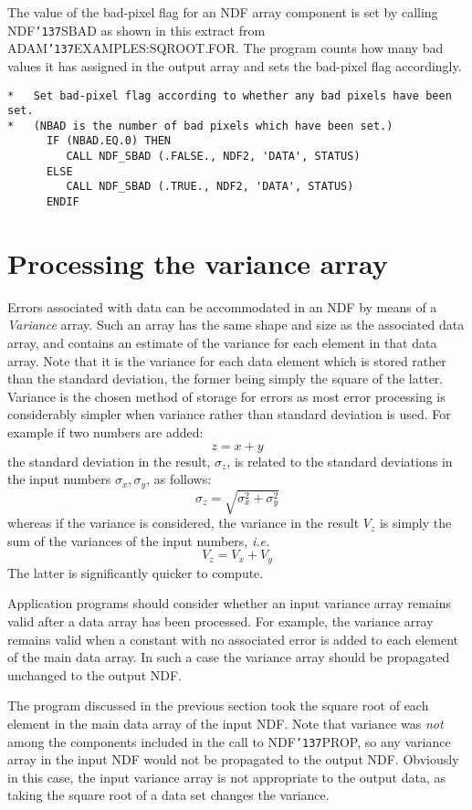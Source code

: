 \documentclass[twoside,11pt]{article}
\renewcommand{\_}{{\tt\char'137}}
\newcommand{\xlabel}[1]{}
\begin{document}
The value of the bad-pixel flag for an NDF array component
is set by calling NDF\_SBAD as shown in this extract
from ADAM\_EXAMPLES:SQROOT.FOR.  The program  counts how many bad values
it has assigned in the output array and sets the bad-pixel flag accordingly.
\begin{verbatim}
*   Set bad-pixel flag according to whether any bad pixels have been set.
*   (NBAD is the number of bad pixels which have been set.)
      IF (NBAD.EQ.0) THEN
         CALL NDF_SBAD (.FALSE., NDF2, 'DATA', STATUS)
      ELSE
         CALL NDF_SBAD (.TRUE., NDF2, 'DATA', STATUS)
      ENDIF
\end{verbatim}

\newpage
\section{Processing the variance array\label{variance}\xlabel{processing_the_variance_array}}

Errors associated with data can be accommodated in an NDF by means of a
{\sl Variance\/} array.
Such an array has the same shape and size
as the associated data array, and contains an estimate of the variance
for each element in that data array.
Note that it is the variance for each data element which is stored
rather than the standard deviation, the former being simply the square
of the latter.
Variance is the chosen method of storage for errors as
most error processing is
considerably simpler when  variance rather than standard deviation is used.
For example if two numbers are added:
$$z=x+y$$
the standard deviation in the result, $\sigma_z$, is related to the standard
deviations in the input numbers $\sigma_x,\sigma_y$, as follows:
$$\sigma_z=\sqrt{\sigma_x^2+\sigma_y^2}$$
whereas if the variance is considered, the variance in the result
$V_z$ is simply the sum of the variances of the input numbers, {\it i.e.}
$$V_z=V_x+V_y$$
The latter is significantly quicker to compute.


Application programs should consider whether an input variance array
remains valid after a data array has been processed.
For example, the variance array remains valid when a
constant with no
associated error is added to each element of the main data array.
In such a case the
variance array should be propagated unchanged to the output NDF.

The program discussed in the previous section took the square root of each
element in the main data array of the input NDF.
Note that variance was {\sl not\/} among the components included in the
call to NDF\_PROP, so any variance array in the input NDF would not
be propagated to the output NDF.
Obviously in this case, the input variance array is not appropriate to the
output data, as taking the square root of a data set
changes the variance.
\end{document}
